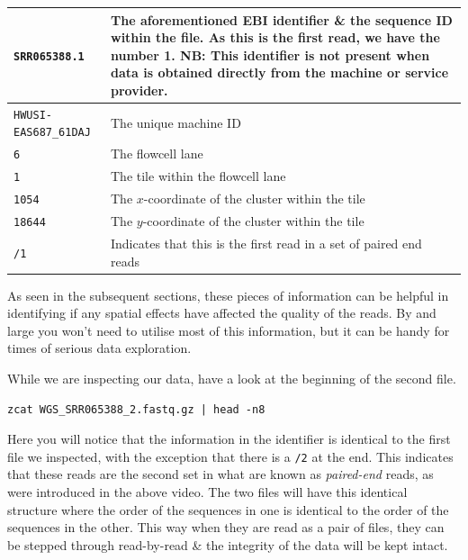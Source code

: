 \begin{tabular}{|p{5cm} | p{9cm} |}
  \hline
  \texttt{SRR065388.1} & The aforementioned EBI identifier \& the sequence ID within the file. As this is the first read, we have the number 1. NB: This identifier is \textbf{not} present when data is obtained directly from the machine or service provider.\\
  \hline
  \texttt{HWUSI-EAS687_61DAJ} & The unique machine ID \\
  \hline
  \texttt{6} & The flowcell lane \\
  \hline
  \texttt{1} & The tile within the flowcell lane \\
  \hline
  \texttt{1054} & The $x$-coordinate of the cluster within the tile \\
  \hline
  \texttt{18644} & The $y$-coordinate of the cluster within the tile \\
  \hline
  \texttt{/1} & Indicates that this is the first read in a set of paired end reads \\
  \hline
\end{tabular}

As seen in the subsequent sections, these pieces of information can be helpful in identifying if any spatial effects have affected the quality of the reads.
By and large you won't need to utilise most of this information, but it can be handy for times of serious data exploration.\\

\begin{steps}
While we are inspecting our data, have a look at the beginning of the second file.
\begin{lstlisting}
zcat WGS_SRR065388_2.fastq.gz | head -n8
\end{lstlisting}
Here you will notice that the information in the identifier is identical to the first file we inspected, with the exception that there is a \texttt{/2} at the end.
This indicates that these reads are the second set in what are known as \textit{paired-end} reads, as were introduced in the above video.
The two files will have this identical structure where the order of the sequences in one is identical to the order of the sequences in the other.
This way when they are read as a pair of files, they can be stepped through read-by-read \& the integrity of the data will be kept intact.
\end{steps}

